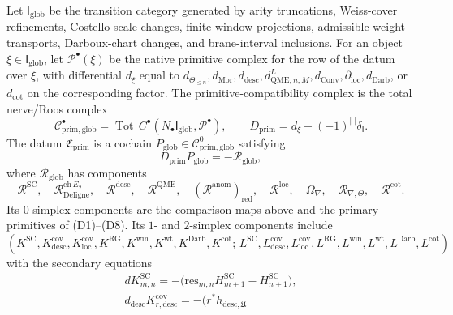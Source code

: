 \begin{defn}
\begin{enumerate}[label=\textup{(D\arabic*)}]
    Let \(\mathsf I_{\mathrm{glob}}\) be the transition category
    generated by arity truncations, Weiss-cover refinements, Costello
    scale changes, finite-window projections, admissible-weight
    transports, Darboux-chart changes, and brane-interval inclusions.
    For an object \(\xi\in\mathsf I_{\mathrm{glob}}\), let
    \(\mathcal P^\bullet(\xi)\) be the native primitive complex for the
    row of the datum over \(\xi\), with differential \(d_\xi\) equal to
    \(d_{\Theta_{\le n}},d_{\mathrm{Mor}},d_{\mathrm{desc}},
    d^L_{\mathrm{QME},n,M},d_{\mathrm{Conv}},\partial_{\mathrm{loc}},
    d_{\mathrm{Darb}}\), or \(d_{\mathrm{cot}}\) on the corresponding
    factor.  The primitive-compatibility complex is the total nerve/Roos
    complex
    \[
      \mathcal C^\bullet_{\mathrm{prim,glob}}
      =
      \operatorname{Tot}\,
      C^\bullet\!\left(
        N_\bullet\mathsf I_{\mathrm{glob}},\mathcal P^\bullet\right),
      \qquad
      D_{\mathrm{prim}}=d_\xi+(-1)^{|\cdot|}\delta_{\mathsf I}.
    \]
    The datum \(\mathfrak C_{\mathrm{prim}}\) is a cochain
    \(P_{\mathrm{glob}}\in\mathcal C^0_{\mathrm{prim,glob}}\) satisfying
    \[
      D_{\mathrm{prim}}P_{\mathrm{glob}}=-\mathcal R_{\mathrm{glob}},
    \]
    where \(\mathcal R_{\mathrm{glob}}\) has components
    \[
      \mathcal R^{\mathrm{SC}},\quad
      \mathcal R^{\mathrm{ch}\,E_2}_{\mathrm{Deligne}},\quad
      \mathcal R^{\mathrm{desc}},\quad
      \mathcal R^{\mathrm{QME}},\quad
      (\mathcal R^{\mathrm{anom}})_{\mathrm{red}},\quad
      \mathcal R^{\mathrm{loc}},\quad
      \Omega_\nabla,\quad
      \mathcal R_{\nabla,\Theta},\quad
      \mathcal R^{\mathrm{cot}} .
    \]
    Its \(0\)-simplex components are the comparison maps above and the
    primary primitives of \textup{(D1)}--\textup{(D8)}.  Its \(1\)- and
    \(2\)-simplex
    components include
    \[
      (K^{\mathrm{SC}},K^{\mathrm{cov}}_{\mathrm{desc}},
       K^{\mathrm{cov}}_{\mathrm{loc}},K^{\mathrm{RG}},K^{\mathrm{win}},
       K^{\mathrm{wt}},K^{\mathrm{Darb}},K^{\mathrm{cot}};\,
       L^{\mathrm{SC}},L^{\mathrm{cov}}_{\mathrm{desc}},
       L^{\mathrm{cov}}_{\mathrm{loc}},L^{\mathrm{RG}},L^{\mathrm{win}},
       L^{\mathrm{wt}},L^{\mathrm{Darb}},L^{\mathrm{cot}})
    \]
    with the secondary equations
    \[
    \begin{gathered}
      dK^{\mathrm{SC}}_{m,n}
      =-\bigl(\mathrm{res}_{m,n}H^{\mathrm{SC}}_{m+1}
        -H^{\mathrm{SC}}_{n+1}\bigr),\\
      d_{\mathrm{desc}}K^{\mathrm{cov}}_{r,\mathrm{desc}}
      =-\bigl(r^*h_{\mathrm{desc},\mathfrak U}

\end{gathered}\]
\end{enumerate}
\end{defn}
